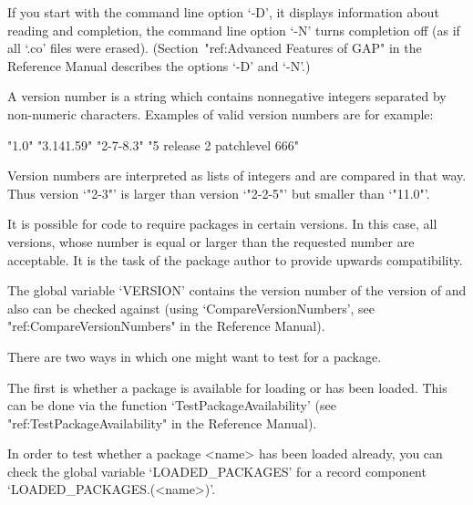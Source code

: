 If you start {\GAP} with the command line option `-D', it displays
information about reading and completion, the command line option `-N' turns
completion off (as if all `.co' files were erased).
(Section~"ref:Advanced Features of GAP" in the Reference Manual describes the
options `-D' and `-N'.)


A version number is a string which contains nonnegative integers separated
by non-numeric characters. Examples of valid version numbers are for
example:

\begintt
"1.0"   "3.141.59"  "2-7-8.3" "5 release 2 patchlevel 666"
\endtt

Version numbers are interpreted as lists of integers and are compared in
that way. Thus version `"2-3"' is larger than version `"2-2-5"' but smaller
than `"11.0"'.

It is possible for code to require {\GAP} packages in certain versions. In
this case, all versions, whose number is equal or larger than the requested
number are acceptable. It is the task of the package author to provide
upwards compatibility.

The global variable `VERSION' contains the version number of the version of
{\GAP} and also can be checked against (using `CompareVersionNumbers', see
"ref:CompareVersionNumbers" in the Reference Manual).



There are two ways in which one might want to test for a {\GAP} package. 

The first is whether a package is available for loading or has been loaded.
This can be done via the function `TestPackageAvailability' (see
"ref:TestPackageAvailability" in the Reference Manual). 

In order to test whether a {\GAP} package <name> has been loaded already, you
can check the global variable `LOADED_PACKAGES' for a record component
`LOADED_PACKAGES.(<name>)'.


